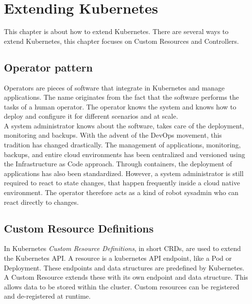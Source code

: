 \chapter{Extending Kubernetes}

This chapter is about how to extend Kubernetes.
There are several ways to extend Kubernetes, this chapter focuses on Custom Resources and Controllers.

\section{Operator pattern}\label{sec:operator-pattern}

Operators are pieces of software that integrate in Kubernetes and manage applications.
The name originates from the fact that the software performs the tasks of a human operator.
The operator knows the system and knows how to deploy and configure it for different scenarios and at scale.~\cite{KUBERNETES-OPERATOR}
\\
A system administrator knows about the software, takes care of the deployment, monitoring and backups.
With the advent of the DevOps movement, this tradition has changed drastically.
The management of applications, monitoring, backups, and entire cloud environments has been centralized and versioned using the Infrastructure as Code approach.
Through containers, the deployment of applications has also been standardized.
However, a system administrator is still required to react to state changes, that happen frequently inside a cloud native environment.
The operator therefore acts as a kind of robot sysadmin who can react directly to changes.~\cite{RED-HAT-OPERATOR}

\section{Custom Resource Definitions}\label{sec:custom-resource-definitions}

In Kubernetes \textit{Custom Resource Definitions}, in short CRDs, are used to extend the Kubernetes API.
A resource is a kubernetes API endpoint, like a Pod or Deployment.
These endpoints and data structures are predefined by Kubernetes.
A Custom Resource extends these with its own endpoint and data structure.
This allows data to be stored within the cluster.
Custom resources can be registered and de-registered at runtime.~\cite{KUBERNETES-CRD}

